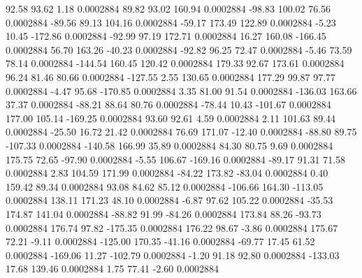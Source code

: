        92.58       93.62        1.18     0.0002884
       89.82       93.02      160.94     0.0002884
      -98.83      100.02       76.56     0.0002884
      -89.56       89.13      104.16     0.0002884
      -59.17      173.49      122.89     0.0002884
       -5.23       10.45     -172.86     0.0002884
      -92.99       97.19      172.71     0.0002884
       16.27      160.08     -166.45     0.0002884
       56.70      163.26      -40.23     0.0002884
      -92.82       96.25       72.47     0.0002884
       -5.46       73.59       78.14     0.0002884
     -144.54      160.45      120.42     0.0002884
      179.33       92.67      173.61     0.0002884
       96.24       81.46       80.66     0.0002884
     -127.55        2.55      130.65     0.0002884
      177.29       99.87       97.77     0.0002884
       -4.47       95.68     -170.85     0.0002884
        3.35       81.00       91.54     0.0002884
     -136.03      163.66       37.37     0.0002884
      -88.21       88.64       80.76     0.0002884
      -78.44       10.43     -101.67     0.0002884
      177.00      105.14     -169.25     0.0002884
       93.60       92.61        4.59     0.0002884
        2.11      101.63       89.44     0.0002884
      -25.50       16.72       21.42     0.0002884
       76.69      171.07      -12.40     0.0002884
      -88.80       89.75     -107.33     0.0002884
     -140.58      166.99       35.89     0.0002884
       84.30       80.75        9.69     0.0002884
      175.75       72.65      -97.90     0.0002884
       -5.55      106.67     -169.16     0.0002884
      -89.17       91.31       71.58     0.0002884
        2.83      104.59      171.99     0.0002884
      -84.22      173.82      -83.04     0.0002884
        0.40      159.42       89.34     0.0002884
       93.08       84.62       85.12     0.0002884
     -106.66      164.30     -113.05     0.0002884
      138.11      171.23       48.10     0.0002884
       -6.87       97.62      105.22     0.0002884
      -35.53      174.87      141.04     0.0002884
      -88.82       91.99      -84.26     0.0002884
      173.84       88.26      -93.73     0.0002884
      176.74       97.82     -175.35     0.0002884
      176.22       98.67       -3.86     0.0002884
      175.67       72.21       -9.11     0.0002884
     -125.00      170.35      -41.16     0.0002884
      -69.77       17.45       61.52     0.0002884
     -169.06       11.27     -102.79     0.0002884
       -1.20       91.18       92.80     0.0002884
     -133.03       17.68      139.46     0.0002884
        1.75       77.41       -2.60     0.0002884
